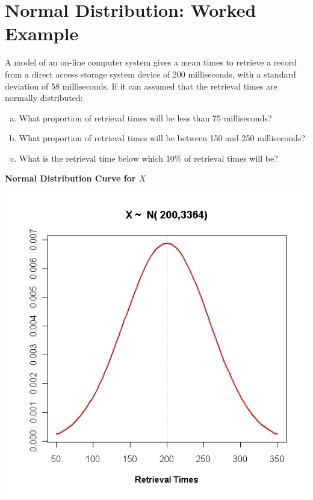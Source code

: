 \documentclass[a4paper,12pt]{article}
\begin{document}
\section*{Normal Distribution: Worked Example}

	
		A model of an on-line computer system gives a mean times to retrieve a record from a direct access storage system device of 200 milliseconds, with a standard deviation of 58 milliseconds. If it can assumed that the retrieval times are normally distributed:
		
		\begin{enumerate}[(a)]
			\item What proportion of retrieval times will be less than 75 milliseconds?
			\item What proportion of retrieval times will be between 150 and 250 milliseconds?
			\item What is the retrieval time below which 10\% of retrieval times will be?
		\end{enumerate}
		

	\noindent \textbf{Normal Distribution Curve for $X$}
	
	\begin{center}
		\includegraphics[scale=0.55]{images/5BNormal1}
	\end{center}
\end{document}
